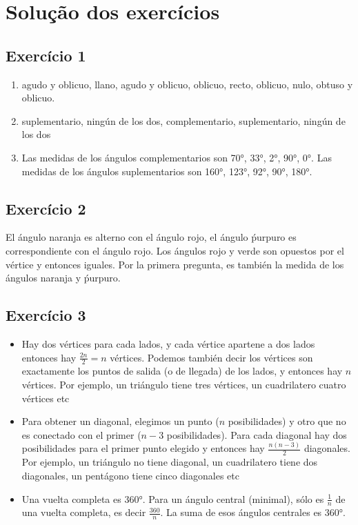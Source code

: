 \section{Solução dos exercícios}

\subsection*{Exercício 1}

\begin{enumerate}
\item agudo y oblicuo, llano, agudo y oblicuo, oblicuo, recto, oblicuo, nulo,
  obtuso y oblicuo.
\item suplementario, ningún de los dos, complementario, suplementario,
  ningún de los dos
\item
Las medidas de los ángulos complementarios son 70°, 33°, 2°, 90°, 0°.
Las medidas de los ángulos suplementarios son 160°, 123°, 92°, 90°, 180°.
\end{enumerate}

\subsection*{Exercício 2}

El ángulo naranja es alterno con el ángulo rojo, el ángulo ṕurpuro es
correspondiente con el ángulo rojo. Los ángulos rojo y verde son opuestos
por el vértice y entonces iguales. Por la primera pregunta,
es también la medida de los ángulos naranja y ṕurpuro.

\subsection*{Exercício 3}

\begin{itemize}
\item Hay dos vértices para cada lados, y cada vértice apartene a dos lados
  entonces hay $\frac{2n}{2} = n$ vértices. Podemos también decir los
  vértices son exactamente los puntos de salida (o de llegada) de los
  lados, y entonces hay $n$ vértices. Por ejemplo, un triángulo tiene tres
  vértices, un cuadrilatero cuatro vértices etc
\item Para obtener un diagonal, elegimos un punto ($n$ posibilidades) y
  otro que no es conectado con el primer ($n-3$ posibilidades). Para cada
  diagonal hay dos posibilidades para el primer punto elegido y entonces
  hay $\frac{n{(n-3)}}{2}$ diagonales. Por ejemplo, un triángulo no tiene 
  diagonal, un cuadrilatero tiene dos diagonales, un pentágono tiene
  cinco diagonales etc
\item Una vuelta completa es 360°. Para un ángulo central (minimal), sólo
  es $\frac{1}{n}$ de una vuelta completa, es decir $\frac{360}{n}$. La suma
  de esos ángulos centrales es 360°.
\end{itemize}

